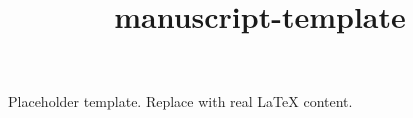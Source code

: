 ﻿\documentclass{article}
\title{manuscript-template}
\begin{document}
\maketitle
Placeholder template. Replace with real LaTeX content.
\end{document}
